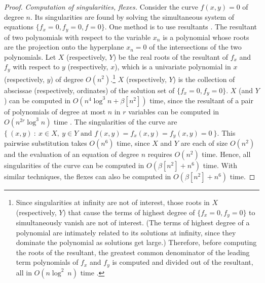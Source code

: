 \begin{proof}
{\em Computation of singularities, flexes.} 
%
Consider the curve $f(x,y) = 0$ of degree $n$.
Its singularities are found by solving the simultaneous system
of equations \mbox{$\{f_{x} = 0, f_{y}=0, f = 0\}$}.
One method is to use resultants \cite{walker}.
The resultant of two polynomials with respect to the variable $x_{n}$ is 
a polynomial
whose roots are the projection onto the hyperplane $x_{n} = 0$
of the intersections of the two polynomials.
Let $X$ (respectively, $Y$) be the real roots of the resultant of $f_{x}$ 
and $f_{y}$ 
with respect to $y$ (respectively, $x$), which is a univariate polynomial 
in $x$ 
(respectively, $y$)
of degree $O(n^{2})$.\footnote{Since 
	singularities at infinity are not of interest, those roots in $X$ 
	(respectively, $Y$)
	that cause the terms of highest degree of 
	\mbox{$\{f_{x} = 0, f_{y}=0\}$} to 
	simultaneously vanish are not of interest.
	(The terms of highest degree of a polynomial are intimately 
	related to its 
	solutions at infinity, since they dominate the polynomial as 
	solutions get large.)
	Therefore, before computing the roots of the resultant, the 
	greatest common denominator of the leading term
	polynomials of $f_{x}$ and $f_{y}$ is computed and divided out 
	of the 
	resultant, all in $O(n\log^{2}\ n)$ time \cite{ahu}.}
$X$ (respectively, $Y$) is the collection of abscissae (respectively, 
ordinates)
of the solution set of \mbox{$\{f_{x} = 0, f_{y}=0\}$}.
$X$ (and $Y$) can be computed in $O(n^{4}\log^{3}n + \beta[n^{2}])$ time, 
since
the resultant of a pair of polynomials of degree at most $n$ in $r$ 
variables 
can be computed in $O(n^{2r}\log^{3}n)$ time \cite{bajj}.
The singularities of the curve are
\mbox{$\{\ (x,y)\ :\ x\in X,\ y \in Y \mbox{ and } f(x,y) 
= f_{x}(x,y) = f_{y}(x,y) = 
0\ \}$.}
This pairwise substitution takes $O(n^{6})$ 
time, since $X$ and $Y$ are each of size $O(n^{2})$ and the evaluation 
of an equation of 
degree $n$ requires $O(n^{2})$ time.
Hence, all singularities of the curve can be computed in 
$O(\beta[n^{2}] + n^{6})$
time.
With similar techniques, the flexes can also be computed in 
$O(\beta[n^{2}] + n^{6})$
time.


\end{proof}
